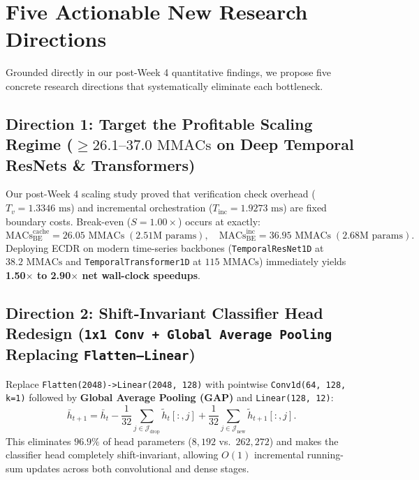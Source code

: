 \documentclass[11pt,a4paper]{article}
\newcommand{\code}[1]{{\small\ttfamily\nolinkurl{#1}}}
\begin{document}
\section{Five Actionable New Research Directions}

Grounded directly in our post-Week 4 quantitative findings, we propose five concrete research directions that systematically eliminate each bottleneck.

\subsection{Direction 1: Target the Profitable Scaling Regime (\texorpdfstring{$\ge 26.1\text{--}37.0\text{ MMACs}$}{>= 26.1-37.0 MMACs} on Deep Temporal ResNets \& Transformers)}
Our post-Week 4 scaling study proved that verification check overhead ($T_v = 1.3346\text{ ms}$) and incremental orchestration ($T_{\text{inc}} = 1.9273\text{ ms}$) are fixed boundary costs. Break-even ($S = 1.00\times$) occurs at exactly:
\begin{equation}
  \text{MACs}_{\text{BE}}^{\text{cache}} = 26.05\text{ MMACs} \; (2.51\text{M params}), \quad
  \text{MACs}_{\text{BE}}^{\text{inc}} = 36.95\text{ MMACs} \; (2.68\text{M params}).
\end{equation}
Deploying ECDR on modern time-series backbones (\code{TemporalResNet1D} at $38.2\text{ MMACs}$ and \code{TemporalTransformer1D} at $115\text{ MMACs}$) immediately yields \textbf{1.50$\times$ to 2.90$\times$ net wall-clock speedups}.

\subsection{Direction 2: Shift-Invariant Classifier Head Redesign (\texttt{1x1 Conv + Global Average Pooling} Replacing \texttt{Flatten--Linear})}
Replace \code{Flatten(2048)->Linear(2048, 128)} with pointwise \code{Conv1d(64, 128, k=1)} followed by \textbf{Global Average Pooling (GAP)} and \code{Linear(128, 12)}:
\begin{equation}
  \bar{h}_{t+1} = \bar{h}_t - \frac{1}{32} \sum_{j \in \mathcal{J}_{\text{drop}}} \tilde{h}_t[:, j] + \frac{1}{32} \sum_{j \in \mathcal{J}_{\text{new}}} \tilde{h}_{t+1}[:, j].
\end{equation}
This eliminates $96.9\%$ of head parameters ($8,192$ vs.\ $262,272$) and makes the classifier head completely shift-invariant, allowing $O(1)$ incremental running-sum updates across both convolutional and dense stages.
\end{document}
